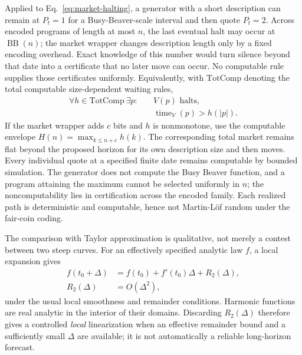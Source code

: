 \documentclass[aps,pra,reprint,superscriptaddress,amsmath,amssymb,floatfix]{revtex4-2}
\theoremstyle{plain}
\theoremstyle{definition}
\theoremstyle{remark}
\begin{document}
Applied to Eq.~\eqref{eq:market-halting}, a generator with a short description
can remain at \(P_t=1\) for a Busy-Beaver-scale interval and then quote
\(P_t=2\). Across encoded programs of length at most \(n\), the last eventual
halt may occur at \(\operatorname{BB}(n)\); the market wrapper changes
description length only by a fixed encoding overhead. Exact knowledge of this
number would turn silence beyond that date into a certificate that no later
move can occur. No computable rule supplies those certificates uniformly.
Equivalently, with \(\mathrm{TotComp}\) denoting the total computable
size-dependent waiting rules,
\begin{equation}
  \begin{aligned}
  \forall h\in\mathrm{TotComp}\ \exists p:\quad
    &V(p)\text{ halts},\\
    &\operatorname{time}_V(p)>h(|p|).
  \end{aligned}
  \label{eq:bb-horizon}
\end{equation}
If the market wrapper adds \(c\) bits and \(h\) is nonmonotone, use the
computable envelope \(H(n)=\max_{k\leq n+c}h(k)\). The corresponding total
market remains flat beyond the proposed horizon for its own description size
and then moves. Every individual quote at a specified finite date remains
computable by bounded simulation. The generator does not compute the Busy
Beaver function, and a program attaining the maximum cannot be selected
uniformly in \(n\); the noncomputability lies in certification across the
encoded family. Each realized path is deterministic and computable, hence not
Martin-L\"of random under the fair-coin coding.

The comparison with Taylor approximation is qualitative, not merely a contest
between two steep curves. For an effectively specified analytic law \(f\), a
local expansion gives
\begin{equation}
  \begin{aligned}
  f(t_0+\Delta)
    &=f(t_0)+f'(t_0)\Delta+R_2(\Delta),\\
  R_2(\Delta)&=O(\Delta^2),
  \end{aligned}
  \label{eq:taylor-local}
\end{equation}
under the usual local smoothness and remainder conditions. Harmonic functions
are real analytic in the interior of their domains. Discarding
\(R_2(\Delta)\) therefore gives a controlled \emph{local} linearization when an
effective remainder bound and a sufficiently small \(\Delta\) are available;
it is not automatically a reliable long-horizon forecast.
\end{document}
